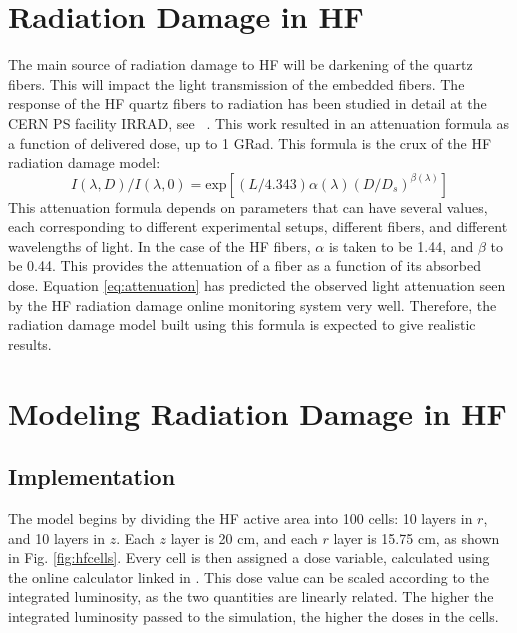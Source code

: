 	\section{Radiation Damage in HF}
		The main source of radiation damage to HF will be darkening of the quartz fibers.  This will impact the light transmission of the embedded fibers.  The response of the HF quartz fibers to radiation has been studied in detail at the CERN PS facility IRRAD, see ~\cite{kerem}.  This work resulted in an attenuation formula as a function of delivered dose, up to 1 GRad.  This formula is the crux of the HF radiation damage model:
		\begin{equation}
			I(\lambda,D)/I(\lambda, 0) = \text{exp}[(L/4.343)\alpha(\lambda)(D/D_{s})^{\beta(\lambda)}]\label{eq:attenuation}
		\end{equation}
		This attenuation formula depends on parameters that can have several values, each corresponding to different experimental setups, different fibers, and different wavelengths of light.  In the case of the HF fibers, \(\alpha\) is taken to be 1.44, and \(\beta\) to be 0.44.  This provides the attenuation of a fiber as a function of its absorbed dose.
		Equation \eqref{eq:attenuation} has predicted the observed light attenuation seen by the HF radiation damage online monitoring system very well. Therefore, the radiation damage model built using this formula is expected to give realistic results.
		
		
	\section{Modeling Radiation Damage in HF}		
		\subsection{Implementation}
			The model begins by dividing the HF active area into 100 cells: 10 layers in $r$, and 10 layers in $z$.  Each $z$ layer is 20 cm, and each $r$ layer is 15.75 cm, as shown in Fig. \ref{fig:hfcells}.  Every cell is then assigned a dose variable, calculated using the online calculator linked in \cite{fluka}.  This dose value can be scaled according to the integrated luminosity, as the two quantities are linearly related.  The higher the integrated luminosity passed to the simulation, the higher the doses in the cells.
			

